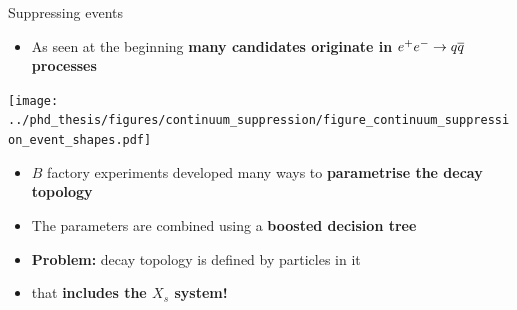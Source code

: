 \documentclass[xcolor=dvipsnames]{beamer}
\begin{document}
\begin{frame}{Suppressing \qqbar events}
   \centering\scriptsize
   \begin{itemize}
      \item As seen at the beginning \textbf{many candidates originate in} {\boldmath$e^+e^-\rightarrow q\overline q$} \textbf{processes}
   \end{itemize}

   \texttt{[image: ../phd\_thesis/figures/continuum\_suppression/figure\_continuum\_suppression\_event\_shapes.pdf]}

\begin{itemize}
\item $B$ factory experiments developed many ways to \textbf{parametrise the decay topology}
\item The parameters are combined using a \textbf{boosted decision tree}
\item \textbf{Problem:} decay topology is defined by particles in it 
\item[\ra] that \textbf{includes the $X_s$ system!}
\end{itemize}




\end{frame}




\end{document}
